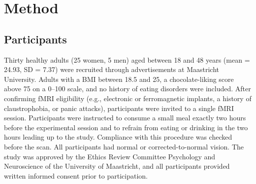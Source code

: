 \documentclass[]{imag-ms-template}
\begin{document}
% 

\newpage

\section{Method} 

\subsection{Participants}

Thirty healthy adults (25 women, 5 men) aged between 18 and 48 years (mean = 24.93, SD = 7.37) were recruited through advertisements at Maastricht University. Adults with a BMI between 18.5 and 25, a chocolate-liking score above 75 on a 0–100 scale, and no history of eating disorders were included. After confirming fMRI eligibility (e.g., electronic or ferromagnetic implants, a history of claustrophobia, or panic attacks), participants were invited to a single fMRI session. Participants were instructed to consume a small meal exactly two hours before the experimental session and to refrain from eating or drinking in the two hours leading up to the study. Compliance with this procedure was checked before the scan. All participants had normal or corrected-to-normal vision. The study was approved by the Ethics Review Committee Psychology and Neuroscience of the University of Maastricht, and all participants provided written informed consent prior to participation.
\end{document}
